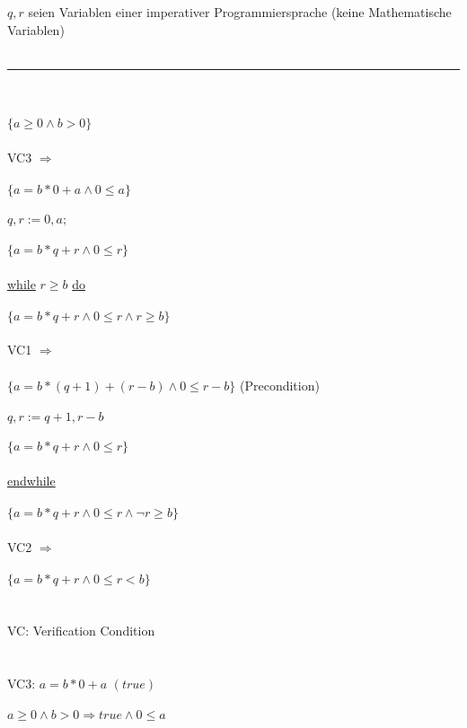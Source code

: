 \documentclass[18pt,a4paper]{article}
\newcommand{\tab}{\hspace*{2em}}
\begin{document}
$q, r$ seien Variablen einer imperativer Programmiersprache (keine Mathematische Variablen)
\\
\\
\rule{\textwidth}{0.4mm}\\
\\
$\{ a\geqslant 0 \wedge b> 0 \}$\\
\\
VC3 $\Rightarrow$\\
\\
$\{ a = b * 0 + a \wedge 0\leqslant a \} $\\
\\
$q, r := 0, a;$\\
\\
$\{ a = b * q + r \wedge 0\leqslant r \} $\\
\\
\uline{while} $r\geqslant b$ \uline{do}\\
\\
$\{ a = b * q + r \wedge 0\leqslant r \wedge r\geqslant b \} $\\
\\
VC1 $\Rightarrow$\\
\\
$\{ a = b * (q+1) + (r-b) \wedge 0\leqslant r-b \} $ (Precondition)\\
\\
\tab $q,r := q+1, r-b$\\
\\
$\{ a = b * q + r \wedge 0\leqslant r \} $\\
\\
\uline{endwhile}\\
\\
$\{ a = b * q + r \wedge 0\leqslant r \wedge \neg r \geqslant b \} $\\
\\
VC2 $\Rightarrow$\\
\\
$\{ a = b * q + r \wedge 0\leqslant r < b\} $\\
\\
\\
VC: Verification Condition\\
\\
\\
VC3: $a = b* 0 + a$  $(true)$\\
\\
\tab $a\geqslant 0 \wedge b > 0 \Rightarrow true \wedge 0 \leqslant a$\\
\\
\\
\end{document}
